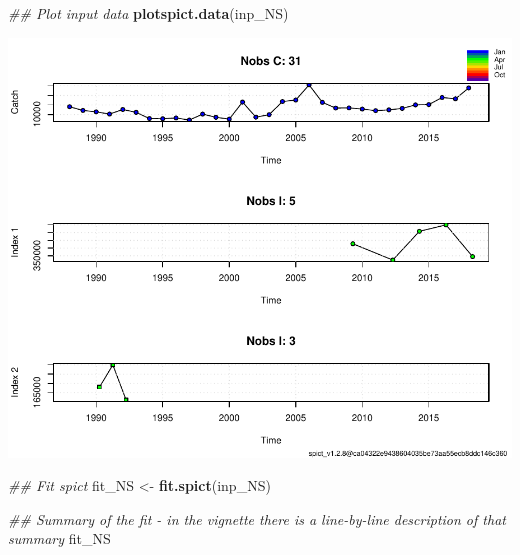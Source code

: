 \documentclass[
]{article}
\newenvironment{Shaded}{\begin{snugshade}}{\end{snugshade}}
\newcommand{\CommentTok}[1]{\textcolor[rgb]{0.56,0.35,0.01}{\textit{#1}}}
\newcommand{\KeywordTok}[1]{\textcolor[rgb]{0.13,0.29,0.53}{\textbf{#1}}}
\newcommand{\NormalTok}[1]{#1}
\newcommand{\StringTok}[1]{\textcolor[rgb]{0.31,0.60,0.02}{#1}}
\begin{document}
\begin{Shaded}
\begin{Highlighting}[]
\CommentTok{## Plot input data}
\KeywordTok{plotspict.data}\NormalTok{(inp_NS)}
\end{Highlighting}
\end{Shaded}

\includegraphics{aru.27.123a4_SPiCT_WD_files/figure-latex/fit_scenario3-1.pdf}

\begin{Shaded}
\begin{Highlighting}[]
\CommentTok{## Fit spict}
\NormalTok{fit_NS <-}\StringTok{ }\KeywordTok{fit.spict}\NormalTok{(inp_NS)}

\CommentTok{## Summary of the fit - in the vignette there is a line-by-line description of that summary}
\NormalTok{fit_NS}
\end{Highlighting}
\end{Shaded}
\end{document}
